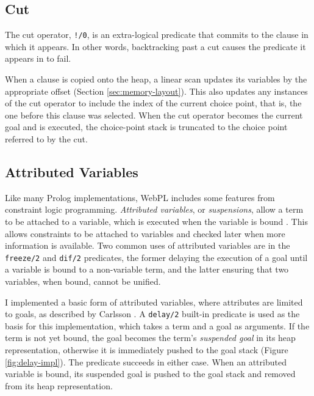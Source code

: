 \subsection{Cut}

The cut operator, \texttt{!/0}, is an extra-logical predicate that commits to the clause in which it appears. In other words, backtracking past a cut causes the predicate it appears in to fail.

When a clause is copied onto the heap, a linear scan updates its variables by the appropriate offset (Section \ref{sec:memory-layout}). This also updates any instances of the cut operator to include the index of the current choice point, that is, the one before this clause was selected. When the cut operator becomes the current goal and is executed, the choice-point stack is truncated to the choice point referred to by the cut.

\subsection{Attributed Variables}

\label{sec:attributed-variables}

Like many Prolog implementations, WebPL includes some features from constraint logic programming. \emph{Attributed variables}, or \emph{suspensions}, allow a term to be attached to a variable, which is executed when the variable is bound \cite{holzbaurMetastructuresvsattributed1992}. This allows constraints to be attached to variables and checked later when more information is available. Two common uses of attributed variables are in the \texttt{freeze/2} and \texttt{dif/2} predicates, the former delaying the execution of a goal until a variable is bound to a non-variable term, and the latter ensuring that two variables, when bound, cannot be unified.

I implemented a basic form of attributed variables, where attributes are limited to goals, as described by Carlsson \cite{carlssonimplementationdiffreeze1986}. A \texttt{delay/2} built-in predicate is used as the basis for this implementation, which takes a term and a goal as arguments. If the term is not yet bound, the goal becomes the term's \emph{suspended goal} in its heap representation, otherwise it is immediately pushed to the goal stack (Figure \ref{fig:delay-impl}). The predicate succeeds in either case. When an attributed variable is bound, its suspended goal is pushed to the goal stack and removed from its heap representation.

